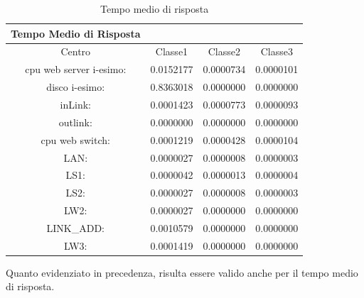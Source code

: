 \begin{table}[htbp]
\begin{center}
\begin{tabular}{|c|c|c|c|}
\hline
Tempo Medio di Risposta\\
\hline
Centro &Classe1 &Classe2 &Classe3\\
\hline
\hline
 cpu web server i-esimo: 	&0.0152177	&0.0000734	&0.0000101\\
\hline
 disco i-esimo: 	&0.8363018	&0.0000000	&0.0000000\\
\hline
 inLink: 	&0.0001423	&0.0000773	&0.0000093\\
\hline
 outlink: 	&0.0000000	&0.0000000	&0.0000000\\
\hline
 cpu web switch: 	&0.0001219	&0.0000428	&0.0000104\\
\hline
 LAN: 	&0.0000027	&0.0000008	&0.0000003\\
\hline
 LS1: 	&0.0000042	&0.0000013	&0.0000004\\
\hline
 LS2: 	&0.0000027	&0.0000008	&0.0000003\\
\hline
 LW2: 	&0.0000027	&0.0000000	&0.0000000\\
\hline
 LINK_ADD: 	&0.0010579	&0.0000000	&0.0000000\\
\hline
 LW3: 	&0.0001419	&0.0000000	&0.0000000\\
\hline
\end{tabular}
\end{center}
\caption{Tempo medio di risposta}
\label{tempomediodirisposta}
\end{table}
Quanto evidenziato in precedenza, risulta essere valido anche per il tempo medio di risposta.
